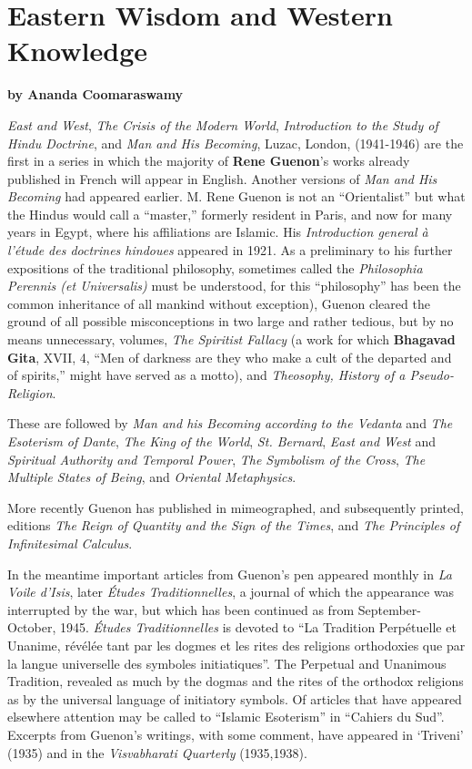 \section{Eastern Wisdom and Western Knowledge}

\textbf{by Ananda Coomaraswamy}

\emph{East and West}, \emph{The Crisis of the Modern World}, \emph{Introduction to the Study of} \emph{Hindu Doctrine}, and \emph{Man and His Becoming}, Luzac, London, (1941-1946) are the first in a series in which the majority of \textbf{Rene Guenon}'s works already published in French will appear in English. Another versions of \emph{Man and His Becoming} had appeared earlier. M. Rene Guenon is not an ``Orientalist'' but what the Hindus would call a ``master,'' formerly resident in Paris, and now for many years in Egypt, where his affiliations are Islamic. His \emph{Introduction general à l'étude des doctrines hindoues} appeared in 1921. As a preliminary to his further expositions of the traditional philosophy, sometimes called the \emph{Philosophia} \emph{Perennis (et Universalis)} must be understood, for this ``philosophy'' has been the common inheritance of all mankind without exception), Guenon cleared the ground of all possible misconceptions in two large and rather tedious, but by no means unnecessary, volumes, \emph{The Spiritist Fallacy} (a work for which \textbf{Bhagavad Gita}, XVII, 4, ``Men of darkness are they who make a cult of the departed and of spirits,'' might have served as a motto), and \emph{Theosophy, History of a Pseudo-Religion}.

These are followed by \emph{Man and his Becoming according to the Vedanta} and \emph{The Esoterism of Dante}, \emph{The King of the World}, \emph{St. Bernard}, \emph{East and West} and \emph{Spiritual Authority and Temporal Power}, \emph{The Symbolism of the Cross}, \emph{The Multiple States of Being}, and \emph{Oriental Metaphysics}.

More recently Guenon has published in mimeographed, and subsequently printed, editions \emph{The Reign of Quantity and the Sign of the Times}, and \emph{The Principles of Infinitesimal Calculus}.

In the meantime important articles from Guenon's pen appeared monthly in \emph{La Voile d'Isis}, later \emph{Études Traditionnelles}, a journal of which the appearance was interrupted by the war, but which has been continued as from September-October, 1945. \emph{Études Traditionnelles} is devoted to ``La Tradition Perpétuelle et Unanime, révélée tant par les dogmes et les rites des religions orthodoxies que par la langue universelle des symboles initiatiques''. The Perpetual and Unanimous Tradition, revealed as much by the dogmas and the rites of the orthodox religions as by the universal language of initiatory symbols. Of articles that have appeared elsewhere attention may be called to ``Islamic Esoterism'' in ``Cahiers du Sud''. Excerpts from Guenon's writings, with some comment, have appeared in `Triveni' (1935) and in the \emph{Visvabharati Quarterly} (1935,1938).

